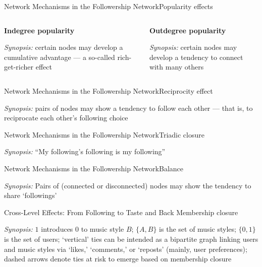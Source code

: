 \documentclass[notes, aspectratio=1610]{beamer}
\begin{document}
\begin{frame}{Network Mechanisms in the Followership Network}{Popularity effects}
	\begin{columns}[t]
		\begin{column}{0.5\textwidth}
			\centering 
			\textbf{Indegree popularity}
			
			

			\raggedright
			\small
			\textit{Synopsis:} certain nodes may develop a cumulative 
			advantage --- a so-called rich-get-richer effect
		\end{column}
		\begin{column}{0.5\textwidth}
			\centering 
			\textbf{Outdegree popularity}
			
			

			\raggedright
			\small
			\textit{Synopsis:} certain nodes may develop a tendency 
			to connect with many others
		\end{column}
	\end{columns}
\end{frame}

\begin{frame}{Network Mechanisms in the Followership Network}{Reciprocity effect}
	\centering 
	

	\raggedright
	\small 
	\textit{Synopsis:} pairs of nodes may show a tendency to follow each 
	other --- that is, to reciprocate each other's following choice 
\end{frame}

\begin{frame}{Network Mechanisms in the Followership Network}{Triadic closure}
	\centering 
	

	\small
	\textit{Synopsis:} ``My following's following is my following'' 
\end{frame}

\begin{frame}{Network Mechanisms in the Followership Network}{Balance}
	\centering 
	

	\small 
	\textit{Synopsis:} Pairs of (connected or disconnected) nodes may 
	show the tendency to share `followings'
\end{frame}

\begin{frame}{Cross-Level Effects: From Following to Taste and Back}
	{Membership closure}
	\centering
	

	\raggedright
	\small 
	\textit{Synopsis:} $1$ introduces $0$ to music style $B$;
        $\{A, B\}$ is the set of music styles; $\{0, 1\}$ is
	the set of users; `vertical' ties can be intended as a bipartite 
	graph linking users and music styles via `likes,' `comments,' or
	`reposts' (mainly, user preferences); dashed arrows denote ties 
	at risk to emerge based on membership closure
\end{frame}
\end{document}
